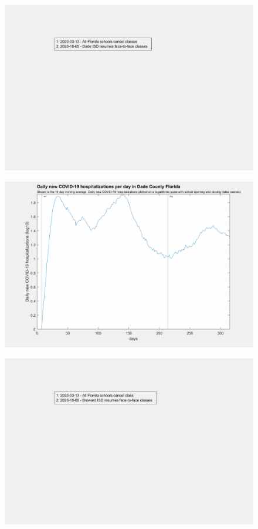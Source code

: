 \documentclass[]{article}
\begin{document}
\begin{figure}[!h]
	\includegraphics[width=\linewidth]{legends/dade_school_legend.png}
	\caption{}
	\label{fig:legends/dade_school_legendLabel}
\end{figure}

\begin{figure}[!h]
	\includegraphics[width=\linewidth]{images/dade_hospitalizations_school_log.png}
	\caption{}
	\label{fig:images/dade_hospitalizations_school_logLabel}
\end{figure}

\begin{figure}[!h]
	\includegraphics[width=\linewidth]{legends/broward_school_legend.png}
	\caption{}
	\label{fig:legends/broward_school_legendLabel}
\end{figure}
\end{document}

